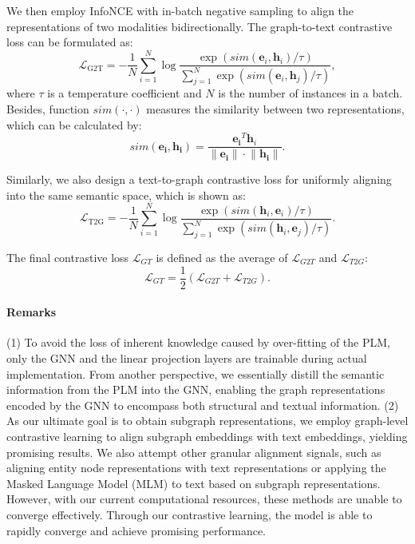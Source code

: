 \documentclass[runningheads]{llncs}
\begin{document}
We then employ InfoNCE with in-batch negative sampling to align the representations of two modalities bidirectionally. The graph-to-text contrastive loss can be formulated as:
\begin{equation}
    \mathcal{L}_{\text{G2T}} = -\frac{1}{N}\sum\limits_{i=1}^N\log\frac{\exp(sim(\boldsymbol{e}_i, \boldsymbol{h}_i) / \tau)}{\sum_{j=1}^N \exp(sim(\boldsymbol{e}_i,\boldsymbol{h}_j) / \tau)},
\end{equation}
where $\tau$ is a temperature coefficient and $N$ is the number of instances in a batch. Besides, function $sim(\cdot, \cdot)$ measures the similarity between two representations, which can be calculated by:
\begin{equation}
    sim(\boldsymbol{e_i},\boldsymbol{h_i}) = \frac{\boldsymbol{e_i}^T\boldsymbol{h}_i}{\lVert \boldsymbol{e_i}\rVert \cdot \lVert \boldsymbol{h_i}\rVert}.
\end{equation}

Similarly, we also design a text-to-graph contrastive loss for uniformly aligning into the same semantic space, which is shown as:
\begin{equation}
    \mathcal{L}_{\text{T2G}} = -\frac{1}{N}\sum\limits_{i=1}^N\log\frac{\exp(sim(\boldsymbol{h}_i, \boldsymbol{e}_i) / \tau)}{\sum_{j=1}^N \exp(sim(\boldsymbol{h}_i,\boldsymbol{e}_j) / \tau)}.
\end{equation}

The final contrastive loss $\mathcal{L}_{GT}$ is defined as the average of $\mathcal{L}_{G2T}$ and $\mathcal{L}_{T2G}$:
\begin{equation}
    \mathcal{L}_{GT} = \frac{1}{2}(\mathcal{L}_{G2T} + \mathcal{L}_{T2G}).
\end{equation}

\paragraph{Remarks} (1) To avoid the loss of inherent knowledge caused by over-fitting of the PLM, only the GNN and the linear projection layers are trainable during actual implementation. From another perspective, we essentially distill the semantic information from the PLM into the GNN, enabling the graph representations encoded by the GNN to encompass both structural and textual information. (2) As our ultimate goal is to obtain subgraph representations, we employ graph-level contrastive learning to align subgraph embeddings with text embeddings, yielding promising results. We also attempt other granular alignment signals, such as aligning entity node representations with text representations or applying the Masked Language Model (MLM) to text based on subgraph representations. However, with our current computational resources, these methods are unable to converge effectively. Through our contrastive learning, the model is able to rapidly converge and achieve promising performance.
\end{document}

